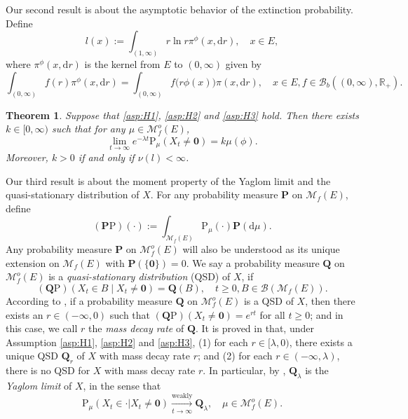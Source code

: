 \documentclass[12pt,a4paper]{amsart}
\numberwithin{equation}{section}
\theoremstyle{plain}
\newtheorem{thm}{Theorem}[section]
\theoremstyle{definition}
\theoremstyle{remark}
\begin{document}
	Our second result is about the asymptotic behavior of the extinction probability.
	Define
\begin{equation}
	l(x)
	:= \int_{(1,\infty)} r\ln r\pi^\phi(x, {\mathrm d}r),\quad x \in E,
\end{equation}
	where $\pi^\phi(x, \mathrm dr)$ is the kernel from $E$ to $(0,\infty)$ given by
\begin{equation}
	\int_{(0,\infty)} f(r)\pi^\phi(x,{\mathrm d}r)
	=\int_{(0,\infty)} f\big(r\phi(x)\big)\pi(x, {\mathrm d}r),
	\quad x\in E, f\in\mathcal B_b((0,\infty),\mathbb R_+).
\end{equation}

\begin{thm} \label{thm:E}
	Suppose that \eqref{asp:H1}, \eqref{asp:H2} and \eqref{asp:H3} hold.	
	Then there exists $k\in [0,\infty)$ such that for any $\mu \in \mathcal M_f^o(E)$,
\begin{equation}
	\lim_{t\rightarrow\infty} e^{-\lambda t}\mathrm P_\mu(X_t \neq \mathbf 0)
	=k\mu(\phi).
\end{equation}
	Moreover, $k>0$ if and only if $\nu(l)<\infty$.
\end{thm}

	Our third result is about the moment property of the Yaglom limit and the quasi-stationary distribution of $X$.
	For any probability measure $\mathbf P$ on $\mathcal M_f(E)$, define
\[
	(\mathbf P\mathrm P)(\cdot)
	:= \int_{\mathcal M_f(E)} \mathrm P_\mu(\cdot)\mathbf P({\mathrm d}\mu).
\]
	Any probability measure $\mathbf P$ on $\mathcal M_f^o(E)$ will also be understood as its unique extension on $\mathcal M_f(E)$ with  $\mathbf P(\{\mathbf 0\}) = 0$.
 We say a probability measure $\mathbf Q$ on $\mathcal M^o_f(E)$ is a \emph{quasi-stationary distribution} (QSD) of $X$, if
\[
	(\mathbf Q \mathrm P) \left( X_t \in B \middle | X_t \neq \mathbf 0 \right)
	= \mathbf Q(B),
	\quad t\geq 0, B \in \mathcal B(\mathcal M_f(E)).
\]
	According to \cite[(1.5)]{LiuRenSongSun2020}, if a probability measure $\mathbf Q$ on $\mathcal M_f^o(E)$ is a QSD of $X$, then there exists an $r\in (-\infty, 0)$ such that $(\mathbf Q\mathrm P)(X_t \neq \mathbf 0) = e^{rt}$ for all $t\geq 0$; and in this case, we call $r$ the \emph{mass decay rate} of $\mathbf Q$.
	It is proved in \cite[Theorem 1.2]{LiuRenSongSun2020} that, under Assumption \eqref{asp:H1}, \eqref{asp:H2} and \eqref{asp:H3},
	(1) for each $r\in [\lambda, 0)$, there exists a unique QSD $\mathbf Q_r$ of $X$ with mass decay rate $r$;
	and (2) for each $r\in (-\infty, \lambda)$, there is no QSD for $X$ with mass decay rate $r$.
	In particular, by \cite[Theorem 1.1, Proposition 1.7]{LiuRenSongSun2020}, $\mathbf Q_\lambda$ is the \emph{Yaglom limit} of $X$, in the sense that
\begin{equation}
	\mathrm P_\mu(X_t \in \cdot | X_t \neq \mathbf 0)
	\xrightarrow[t\to \infty]{\text{weakly}} \mathbf Q_\lambda,
	\quad \mu \in \mathcal M_f^o(E).
\end{equation}
\end{document}
